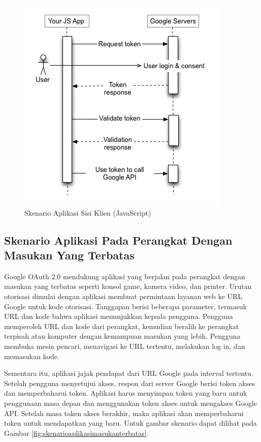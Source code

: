\begin{figure}[H]
\centering
\includegraphics[scale=1]{Gambar/skenario2.png}
\caption[Gambar Skenario Aplikasi Sisi Klien (JavaScript)]{Skenario Aplikasi Sisi Klien (JavaScript)}
\label{fig:skenarioaplikasisisiklien}
\end{figure}

\subsection{Skenario Aplikasi Pada Perangkat Dengan Masukan Yang Terbatas}
Google OAuth 2.0 mendukung aplikasi yang berjalan pada perangkat dengan masukan yang terbatas seperti konsol game, kamera video, dan printer. Urutan otorisasi dimulai dengan aplikasi membuat permintaan layanan web ke URL Google untuk kode otorisasi. Tanggapan berisi beberapa parameter, termasuk URL dan kode bahwa aplikasi menunjukkan kepada pengguna. Pengguna memperoleh URL dan kode dari perangkat, kemudian beralih ke perangkat terpisah atau komputer dengan kemampuan masukan yang lebih. Pengguna membuka mesin pencari, menavigasi ke URL tertentu, melakukan log in, dan memasukan kode.

Sementara itu, aplikasi jajak pendapat dari URL Google pada interval tertentu. Setelah pengguna menyetujui akses, respon dari server Google berisi token akses dan memperbaharui token. Aplikasi harus menyimpan token yang baru untuk penggunaan masa depan dan menggunakan token akses untuk mengakses Google API. Setelah masa token akses berakhir, maka aplikasi akan memperbaharui token untuk mendapatkan yang baru. Untuk gambar skenario dapat dilihat pada Gambar \ref{fig:skenarioaplikasimasukanterbatas}.

